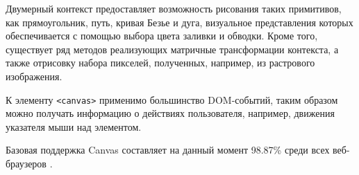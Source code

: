 Двумерный контекст предоставляет возможность рисования таких примитивов, как прямоугольник, путь, кривая Безье и дуга, визуальное представления которых обеспечивается с помощью выбора цвета заливки и обводки. Кроме того, существует ряд методов реализующих матричные трансформации контекста, а также отрисовку набора пикселей, полученных, например, из растрового изображения.

К элементу \lstinline|<canvas>| применимо большинство DOM-событий, таким образом можно получать информацию о действиях пользователя, например, движения указателя мыши над элементом.

Базовая поддержка Canvas составляет на данный момент 98.87\% среди всех веб-браузеров \cite{caniuse-canvas}.

%
%
%
